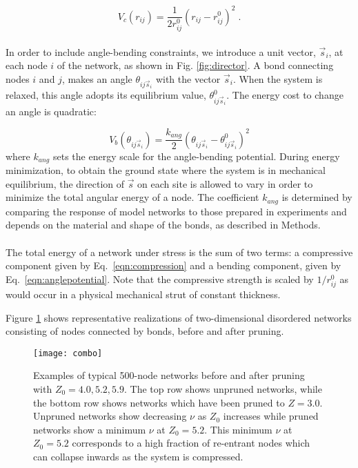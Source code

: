 \documentclass[9pt,twocolumn,twoside]{pnas-new}
\begin{document}
\begin{equation}
V_{c}(r_{ij}) = \frac{1}{2r_{ij}^{0}} (r_{ij}-r_{ij}^{0})^{2} \;.
\label{eqn:compression}
\end{equation}

\paragraph{}
In order to include angle-bending constraints, we introduce a unit vector, $\vec s_i$, at each node $i$ of the network, as shown in Fig. \ref{fig:director}.  A bond connecting nodes $i$ and $j$, makes an angle $\theta_{ij\vec s_i}$ with the vector $\vec s_i$.  When the system is relaxed, this angle adopts its equilibrium value, $\theta_{ij\vec s_i}^{0}$. The energy cost to change an angle is quadratic:

\begin{equation}
V_b(\theta_{ij\vec s_i}) = \frac{k_{ang}}{2} (\theta _{ij\vec s_i}-\theta_{ij\vec s_i}^{0}) ^{2}
\label{eqn:anglepotential}
\end{equation}
where $k_{ang}$ sets the energy scale for the angle-bending potential.  During energy minimization, to obtain the ground state where the system is in mechanical equilibrium, the direction of $\vec s$ on each site is allowed to vary in order to minimize the total angular energy of a node.  The coefficient $k_{ang}$ is determined by comparing the response of model networks to those prepared in experiments and depends on the material and shape of the bonds, as described in Methods.


\paragraph{}
The total energy of a network under stress is the sum of two terms: a compressive component given by Eq.~\ref{eqn:compression} and a bending component, given by Eq.~\ref{eqn:anglepotential}.  Note that the compressive strength is scaled by $1/r_{ij}^{0}$ as would occur in a physical mechanical strut of constant thickness.




Figure \ref{fig:combo} shows representative realizations of two-dimensional disordered networks consisting of nodes connected by bonds, before and after pruning.

\begin{figure}
	\centering
	\texttt{[image: combo]}
\caption{Examples of typical 500-node networks before and after pruning with $Z_{0}=4.0, 5.2, 5.9$.  The top row shows unpruned networks, while the bottom row shows networks which have been pruned to $Z=3.0$.  Unpruned networks show decreasing $\nu$ as $Z_{0}$ increases while pruned networks show a minimum $\nu$ at $Z_{0}=5.2$.  This minimum $\nu$ at $Z_{0}=5.2$ corresponds to a high fraction of re-entrant nodes which can collapse inwards as the system is compressed. }
	\label{fig:combo}
\end{figure}
\end{document}
